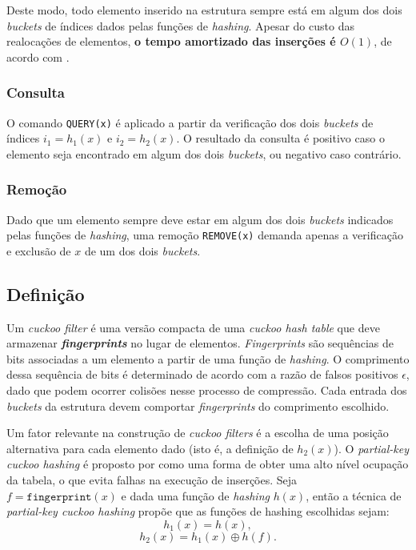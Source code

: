 \documentclass[12pt,twoside,english,brazilian]{article}
\begin{document}
Deste modo, todo elemento inserido na estrutura sempre está em algum dos dois \textit{buckets} de índices dados pelas funções de \textit{hashing}. Apesar do custo das realocações de elementos, \textbf{o tempo amortizado das inserções é $O(1)$}, de acordo com \citet{cuckoo}.

\subsubsection{Consulta}

O comando \texttt{QUERY(x)} é aplicado a partir da verificação dos dois \textit{buckets} de índices $i_1 = h_1(x)$ e $i_2 = h_2(x)$. O resultado da consulta é positivo caso o elemento seja encontrado em algum dos dois \textit{buckets}, ou negativo caso contrário.

\subsubsection{Remoção}

Dado que um elemento sempre deve estar em algum dos dois \textit{buckets} indicados pelas funções de \textit{hashing}, uma remoção \texttt{REMOVE(x)} demanda apenas a verificação e exclusão de $x$ de um dos dois \textit{buckets}.

\subsection{Definição}

Um \textit{cuckoo filter} é uma versão compacta de uma \textit{cuckoo hash table} que deve armazenar \textbf{\textit{fingerprints}} no lugar de elementos. \textit{Fingerprints} são sequências de bits associadas a um elemento a partir de uma função de \textit{hashing}. O comprimento dessa sequência de bits é determinado de acordo com a razão de falsos positivos $\epsilon$, dado que podem ocorrer colisões nesse processo de compressão. Cada entrada dos \textit{buckets} da estrutura devem comportar \textit{fingerprints} do comprimento escolhido.

Um fator relevante na construção de \textit{cuckoo filters} é a escolha de uma posição alternativa para cada elemento dado (isto é, a definição de $h_2(x)$). O \textit{partial-key cuckoo hashing} é proposto por \citet{cuckoo} como uma forma de obter uma alto nível ocupação da tabela, o que evita falhas na execução de inserções. Seja $f= \texttt{fingerprint}(x)$ e dada uma função de \textit{hashing} $h(x)$, então a técnica de \textit{partial-key cuckoo hashing} propõe que as funções de hashing escolhidas sejam:  $$h_1(x) = h(x),$$ $$h_2(x) = h_1(x) \oplus h(f).$$
\end{document}
